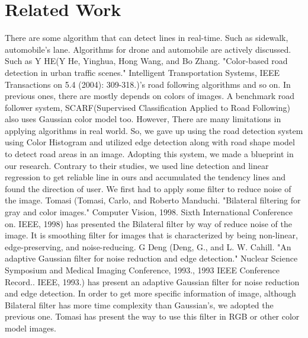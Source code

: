 \section{Related Work}
\label{sec:relatedwork}
There are some algorithm that can detect lines in real-time. Such as sidewalk, automobile's lane. Algorithms for drone and automobile are actively discussed. Such as Y HE(Y He, Yinghua, Hong Wang, and Bo Zhang. "Color-based road detection in urban traffic scenes." Intelligent Transportation Systems, IEEE Transactions on 5.4 (2004): 309-318.)'s road following algorithms and so on. \newline
In previous ones, there are mostly depends on colors of images. A benchmark road follower system, SCARF(Supervised Classification Applied to Road Following) also uses Gaussian color model too. However, There are many limitations in applying  algorithms in real world. So, we gave up using the road detection system using Color Histogram and utilized edge detection along with road shape model to detect road areas in an image. Adopting this system, we made a blueprint in our research. Contrary to their studies, we used line detection and linear regression to get reliable line in ours and accumulated the tendency lines and found the direction of user. \newline
We first had to apply some filter to reduce noise of the image. Tomasi (Tomasi, Carlo, and Roberto Manduchi. "Bilateral filtering for gray and color images." Computer Vision, 1998. Sixth International Conference on. IEEE, 1998) has presented the Bilateral filter by way of reduce noise of the image. It is smoothing filter for images that is characterized by being non-linear, edge-preserving, and noise-reducing. G Deng (Deng, G., and L. W. Cahill. "An adaptive Gaussian filter for noise reduction and edge detection." Nuclear Science Symposium and Medical Imaging Conference, 1993., 1993 IEEE Conference Record.. IEEE, 1993.) has present an adaptive Gaussian filter for noise reduction and edge detection. In order to get more specific information of image, although Bilateral filter has more time complexity than Gaussian's, we adopted the previous one. Tomasi has present the way to use this filter in RGB or other color model images.\newline
